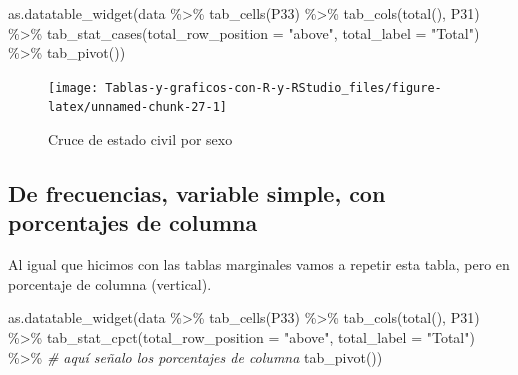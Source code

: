 \documentclass[
]{book}
\newenvironment{Shaded}{\begin{snugshade}}{\end{snugshade}}
\newcommand{\AttributeTok}[1]{\textcolor[rgb]{0.77,0.63,0.00}{#1}}
\newcommand{\CommentTok}[1]{\textcolor[rgb]{0.56,0.35,0.01}{\textit{#1}}}
\newcommand{\FunctionTok}[1]{\textcolor[rgb]{0.00,0.00,0.00}{#1}}
\newcommand{\NormalTok}[1]{#1}
\newcommand{\SpecialCharTok}[1]{\textcolor[rgb]{0.00,0.00,0.00}{#1}}
\newcommand{\StringTok}[1]{\textcolor[rgb]{0.31,0.60,0.02}{#1}}
\begin{document}
\begin{Shaded}
\begin{Highlighting}[]
\FunctionTok{as.datatable\_widget}\NormalTok{(data }\SpecialCharTok{\%\textgreater{}\%}
  \FunctionTok{tab\_cells}\NormalTok{(P33) }\SpecialCharTok{\%\textgreater{}\%}
  \FunctionTok{tab\_cols}\NormalTok{(}\FunctionTok{total}\NormalTok{(), P31) }\SpecialCharTok{\%\textgreater{}\%}
  \FunctionTok{tab\_stat\_cases}\NormalTok{(}\AttributeTok{total\_row\_position =} \StringTok{"above"}\NormalTok{, }\AttributeTok{total\_label =} \StringTok{"Total"}\NormalTok{) }\SpecialCharTok{\%\textgreater{}\%}
  \FunctionTok{tab\_pivot}\NormalTok{())}
\end{Highlighting}
\end{Shaded}

\begin{figure}[H]

{\centering \texttt{[image: Tablas-y-graficos-con-R-y-RStudio\_files/figure-latex/unnamed-chunk-27-1]} 

}

\caption{Cruce de estado civil por sexo}\label{fig:unnamed-chunk-27}
\end{figure}

\hypertarget{de-frecuencias-variable-simple-con-porcentajes-de-columna}{%
\subsection{De frecuencias, variable simple, con porcentajes de columna}\label{de-frecuencias-variable-simple-con-porcentajes-de-columna}}

Al igual que hicimos con las tablas marginales vamos a repetir esta tabla, pero en porcentaje de columna (vertical).

\begin{Shaded}
\begin{Highlighting}[]
\FunctionTok{as.datatable\_widget}\NormalTok{(data }\SpecialCharTok{\%\textgreater{}\%}
    \FunctionTok{tab\_cells}\NormalTok{(P33) }\SpecialCharTok{\%\textgreater{}\%}
    \FunctionTok{tab\_cols}\NormalTok{(}\FunctionTok{total}\NormalTok{(), P31) }\SpecialCharTok{\%\textgreater{}\%}
    \FunctionTok{tab\_stat\_cpct}\NormalTok{(}\AttributeTok{total\_row\_position =} \StringTok{"above"}\NormalTok{, }\AttributeTok{total\_label =} \StringTok{"Total"}\NormalTok{) }\SpecialCharTok{\%\textgreater{}\%} \CommentTok{\# aquí señalo los porcentajes de columna}
    \FunctionTok{tab\_pivot}\NormalTok{())}
\end{Highlighting}
\end{Shaded}
\end{document}
